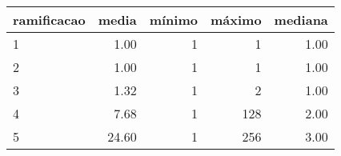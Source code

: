 \begin{table}[ht]
\centering
\begin{tabular}{lrrrr}
  \hline
ramificacao & media & mínimo & máximo & mediana \\ 
  \hline
1 & 1.00 &   1 &   1 & 1.00 \\ 
  2 & 1.00 &   1 &   1 & 1.00 \\ 
  3 & 1.32 &   1 &   2 & 1.00 \\ 
  4 & 7.68 &   1 & 128 & 2.00 \\ 
  5 & 24.60 &   1 & 256 & 3.00 \\ 
   \hline
\end{tabular}
\end{table}
